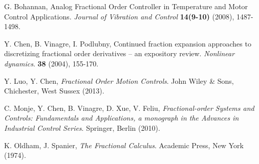 
 \begin{thebibliography}{99}
 \normalsize

  G. Bohannan,
  Analog Fractional Order Controller in Temperature and Motor Control Applications.
  {\it Journal of Vibration and Control} {\bf 14(9-10)} (2008), 1487-1498.



  Y. Chen, B. Vinagre, I. Podlubny,
  Continued fraction expansion approaches to discretizing fractional order
    derivatives -- an expository review.
  {\it Nonlinear dynamics}. {\bf 38} (2004), 155-170.


  Y. Luo, Y. Chen,
  {\it Fractional Order Motion Controls}.
  John Wiley {\&} Sons, Chichester, West Sussex (2013).

  C. Monje, Y. Chen, B. Vinagre, D. Xue, V. Feliu,
  {\it Fractional-order Systems and Controls: Fundamentals and Applications, a monograph in the Advances in Industrial Control Series}.
  Springer, Berlin (2010).


  K. Oldham, J. Spanier,
  {\it The Fractional Calculus}.
  Academic Press, New York (1974). 

\end{thebibliography}
